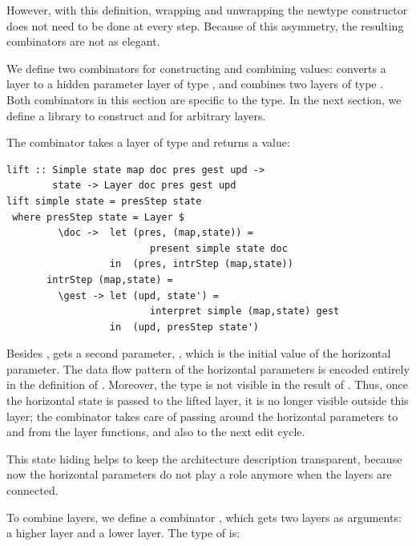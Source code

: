 \documentclass[preprint,natbib]{sigplanconf}
\begin{document}
\bc

However, with this definition, wrapping and unwrapping the newtype constructor does not need to be done at every step. Because of this asymmetry, the resulting combinators are not as elegant.
\ec

We define two combinators for constructing and combining  values:  converts  a  layer to a hidden parameter layer of type , and  combines two layers of type . Both combinators in this section are specific to the  type. In the next section, we define a library to construct  and  for arbitrary layers.



The combinator  takes a layer of type  and returns a  value:

\begin{small}
\begin{verbatim}
lift :: Simple state map doc pres gest upd ->
        state -> Layer doc pres gest upd
lift simple state = presStep state 
 where presStep state = Layer $
         \doc ->  let (pres, (map,state)) = 
                         present simple state doc                                         
                  in  (pres, intrStep (map,state))
       intrStep (map,state) =
         \gest -> let (upd, state') = 
                         interpret simple (map,state) gest                     
                  in  (upd, presStep state')
\end{verbatim}%
\end{small}

Besides ,  gets a second parameter, , which is the initial value of the horizontal parameter. The data flow pattern of the horizontal parameters is encoded entirely in the definition of . Moreover, the  type is not visible in the result of . Thus, once the horizontal state is passed to the lifted layer, it is no longer visible outside this layer; the  combinator takes care of passing around the horizontal parameters to and from the layer functions, and also to the next edit cycle. 

\bc This state hiding helps to keep the architecture description transparent, because now the horizontal parameters do not play a role anymore when the layers are connected.
\ec


To combine layers, we define a combinator , which gets two layers as arguments: a higher layer and a lower layer. The type of  is:
\end{document}
